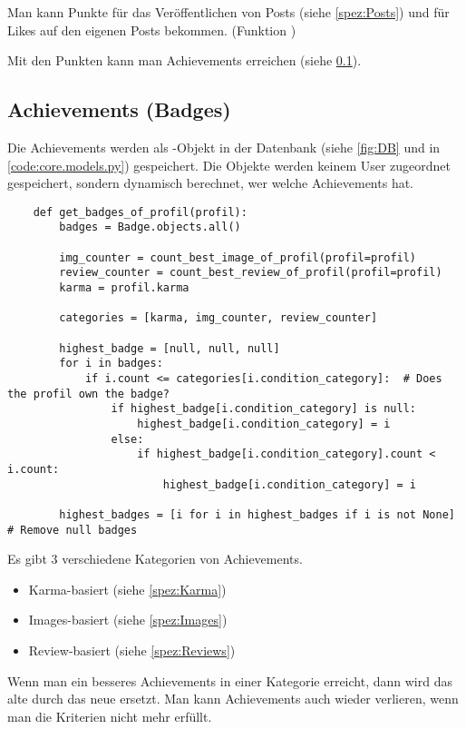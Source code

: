 Man kann Punkte für das Veröffentlichen von Posts (siehe \ref{spez:Posts}) und für
Likes auf den eigenen Posts bekommen. (Funktion )

Mit den Punkten kann man Achievements erreichen (siehe \ref{spez:Badges}).

\subsection{Achievements (Badges)} \label{spez:Badges}

Die Achievements werden als -Objekt in der Datenbank (siehe \ref{fig:DB} und in
\ref{code:core.models.py}) gespeichert. Die Objekte werden keinem User
zugeordnet gespeichert, sondern dynamisch berechnet, wer welche Achievements
hat.

\begin{lstlisting}
    def get_badges_of_profil(profil):
        badges = Badge.objects.all()

        img_counter = count_best_image_of_profil(profil=profil)
        review_counter = count_best_review_of_profil(profil=profil)
        karma = profil.karma

        categories = [karma, img_counter, review_counter]

        highest_badge = [null, null, null]
        for i in badges:
            if i.count <= categories[i.condition_category]:  # Does the profil own the badge?
                if highest_badge[i.condition_category] is null:
                    highest_badge[i.condition_category] = i
                else:
                    if highest_badge[i.condition_category].count < i.count:
                        highest_badge[i.condition_category] = i
        
        highest_badges = [i for i in highest_badges if i is not None]  # Remove null badges
\end{lstlisting}



Es gibt 3 verschiedene Kategorien von Achievements.
\begin{itemize}
    \item Karma-basiert (siehe \ref{spez:Karma})
    \item Images-basiert (siehe \ref{spez:Images})
    \item Review-basiert (siehe \ref{spez:Reviews})
\end{itemize}

Wenn man ein besseres Achievements in einer Kategorie erreicht, dann wird das
alte durch das neue ersetzt. Man kann Achievements auch wieder verlieren, wenn
man die Kriterien nicht mehr erfüllt.

